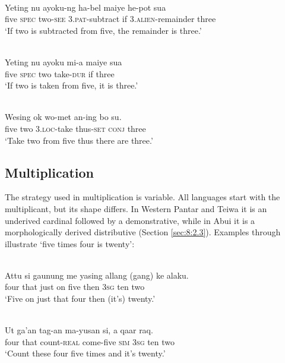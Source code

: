 \documentclass[output=paper]{LSP/langsci}
\begin{document}
\ea
\label{ex:8:1242}
\\
 \gll Yeting  nu  ayoku-ng  ha-bel  maiye  he-pot  sua\\
  five  \textsc{spec}   two-\textsc{see } 3.\textsc{pat}{}-subtract  if  \textsc{3.alien}{}-remainder  three \\
 \glt `If two is subtracted from five, the remainder is three.' 
\z 
  
\ea
\label{ex:8:1243}
\\
 \gll Yeting  nu  ayoku  mi-a  maiye  sua\\
  five  \textsc{spec } two  take-\textsc{dur } if  three   \\
 \glt `If two is taken from five, it is three.' 
\z
 
  

\ea%
\label{bkm:Ref358115306}
  
\\
\gll  Wesing  ok  wo-met  an-ing  bo  su.   \\  
    five  two   3.\textsc{loc-}take  thus\textsc{{}-set}  \textsc{conj} three   \\
\glt `Take two from five thus there are three.' 
\z



 

 

\subsection{Multiplication}
\label{sec:8:Multiplication}
The strategy used in multiplication is variable. All languages start with the multiplicant, but its shape differs. In Western Pantar and Teiwa it is an underived cardinal followed by a demonstrative, while in Abui it is a morphologically derived distributive (Section \ref{sec:8:2.3}). Examples  through   illustrate `five times four is twenty':


\ea%
\label{bkm:Ref358043144}
  
\\
\gll Attu  si  gaunung  me  yasing   allang  (gang)  ke alaku. \\  
   four  that  just  on  five  then  3\textsc{sg } ten two   \\
\glt `Five on just that four then (it's) twenty.'
\z


\ea
\label{ex:8:1244}
\\ 
 \gll   Ut  ga'an  tag-an  ma-yusan  si,  a   qaar raq.  \\
    four  that   count-\textsc{real } come-five  \textsc{sim}  \textsc{3sg} ten two  \\
 \glt `Count these four five times and it's twenty.'
\z
\end{document}
